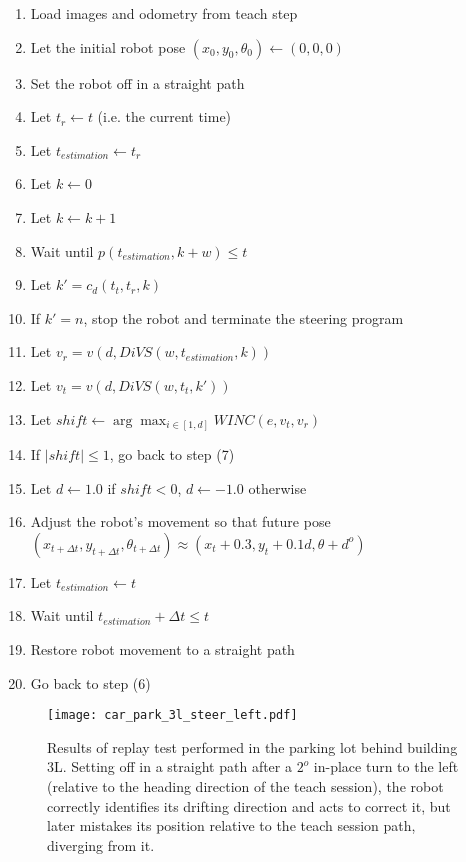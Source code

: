 \documentclass[twocolumn, 9pt,fleqn]{jsproceedings}
\begin{document}
\begin{enumerate}
\item Load images and odometry from teach step
\item Let the initial robot pose $(x_0, y_0, \theta_0) \gets (0, 0, 0)$
\item Set the robot off in a straight path
\item Let $t_r \gets t$ (i.e. the current time)
\item Let $t_{estimation} \gets t_r$
\item Let $k \gets 0$
\item Let $k \gets k + 1$
\item Wait until $p(t_{estimation}, k+w) \leq t$
\item Let $k' = c_d(t_t, t_r, k)$
\item If $k' = n$, stop the robot and terminate the steering program
\item Let $v_r = v(d, DiVS(w, t_{estimation}, k))$
\item Let $v_t = v(d, DiVS(w, t_t, k'))$
\item Let $shift \gets \arg \max_{i \in [1, d]}{WINC(e, v_t, v_r)}$
\item If $|shift| \leq 1$, go back to step (7)
\item Let $d \gets 1.0$ if $shift < 0$, $d \gets -1.0$ otherwise
\item Adjust the robot's movement so that future pose $(x_{t+\Delta t}, y_{t+\Delta t}, \theta_{t+\Delta t}) \approx (x_t + 0.3, y_t + 0.1d, \theta + d^o)$
\item Let $t_{estimation} \gets t$
\item Wait until $t_{estimation} + \Delta t \leq t$
\item Restore robot movement to a straight path
\item Go back to step (6)
\end{enumerate}

\begin{figure}[h!]
\centering
\texttt{[image: car\_park\_3l\_steer\_left.pdf]}
\caption{Results of replay test performed in the parking lot behind building 3L. Setting off in a straight path after a $2^o$ in-place turn to the left (relative to the heading direction of the teach session), the robot correctly identifies its drifting direction and acts to correct it, but later mistakes its position relative to the teach session path, diverging from it.}
\label{fig:car_park_3l_steer_left}
\end{figure}
\end{document}
